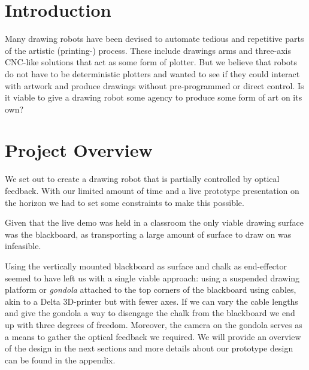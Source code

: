 \documentclass[a4paper,10pt]{article}
\begin{document}
\section{Introduction}
\label{sec:intro}


Many drawing robots have been devised to automate tedious and
repetitive parts of the artistic (printing-) process.
These include drawings arms and three-axis CNC-like solutions that
act as some form of plotter.
But we believe that robots do not have to be deterministic plotters
and wanted to see if they could interact with artwork and produce
drawings without pre-programmed or direct control.
Is it viable to give a drawing robot some agency to produce some
form of art on its own?

\section{Project Overview}
\label{sec:overview}

We set out to create a drawing robot that is partially controlled by
optical feedback.
With our limited amount of time and a live prototype presentation
on the horizon we had to set some constraints to make this possible.

Given that the live demo was held in a classroom the only viable drawing
surface was the blackboard, as transporting a large amount of surface
to draw on was infeasible.

Using the vertically mounted blackboard as surface and chalk as
end-effector seemed to have left us with a single viable approach:
using a suspended drawing platform or \emph{gondola} attached to the top corners of the
blackboard using cables, akin to a Delta 3D-printer but with fewer axes.
If we can vary the cable lengths and give the gondola a way to
disengage the chalk from the blackboard we end up with three
degrees of freedom.
Moreover, the camera on the gondola serves as a means to gather the
optical feedback we required.
We will provide an overview of the design in the next sections and
more details about our prototype design can be found in the appendix.
\end{document}
